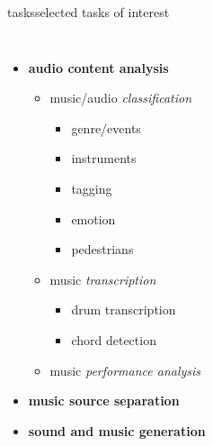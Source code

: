         \begin{frame}{tasks}{selected tasks of interest}
            \vspace{-9mm}
            \begin{columns}
            \begin{itemize}
                \item   \textbf{audio content analysis} \cite{lerch_introduction_2023}
                    \begin{itemize}
                        \item   music/audio \textit{classification}
                            \begin{itemize}
                                \item genre/events \cite{burred_hierarchical_2004, hung_low-resource_2023}
                                \item instruments \cite{gururani_semi-supervised_2021, chen_music_2023, ding_audio_2023}
                                \item tagging \cite{ding_audio_2023, ding_embedding_2024, ma_music_2024}
                                \item emotion \cite{watcharasupat_uncertainty_2025}
                                \item pedestrians \cite{seshadri_asped_2024, han_understanding_2024}
                            \end{itemize}
                        \item   music \textit{transcription}
                            \begin{itemize}
                                \item drum transcription \cite{wu_review_2018}
                                \item chord detection \cite{zhou_chord_2015}
                            \end{itemize}
                        \item   music \textit{performance analysis} \cite{pati_assessment_2018}
                    \end{itemize}
                 \smallskip
                 \item<2->  \textbf{music source separation} \cite{hung_multi-task_2020, watcharasupat_generalized_2024, watcharasupat_stem-agnostic_2024}
                 \smallskip
                 \item<3->  \textbf{sound and music generation}
                    \begin{itemize}

\end{itemize}
\end{itemize}
\end{columns}
\end{frame}
